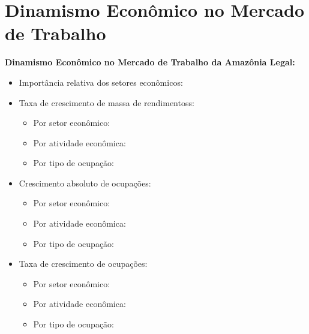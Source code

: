 \documentclass[8pt]{beamer}
\begin{document}
\section{Dinamismo Econômico no Mercado de Trabalho}

\begin{frame}[label=indice_principal_amz]{}

\textit{\hyperlink{indice_principal}{}}

\textbf{Dinamismo Econômico no Mercado de Trabalho da Amazônia Legal:}
\vspace{2mm}
\begin{itemize}

\item{Importância relativa dos setores econômicos: \hyperlink{_importancia_relativa}{}}
\vspace{1mm}

\item{Taxa de crescimento  de massa de rendimentoss:
	\begin{itemize}
	\item{Por setor econômico: \hyperlink{rkngtxmassaporsetor}{}}
	\item{Por atividade econômica: \hyperlink{rkngtxmassaporatividade}{}}
	\item{Por tipo de ocupação: \hyperlink{rkngtxmassaporocupacao}{}}
	\end{itemize}
}
\vspace{1mm}

\item{Crescimento  absoluto de ocupações:
	\begin{itemize}
	\item{Por setor econômico: \hyperlink{rkngnocuporsetor}{}}
	\item{Por atividade econômica: \hyperlink{rkngnocuporatividade}{}}
	\item{Por tipo de ocupação: \hyperlink{rkngnocuporocupacao}{}}
	\end{itemize}
}
\vspace{1mm}

\item{Taxa de crescimento de ocupações:
	\begin{itemize}
	\item{Por setor econômico: \hyperlink{rkngtxocuporsetor}{}}
	\item{Por atividade econômica: \hyperlink{rkngtxocuporatividade}{}}
	\item{Por tipo de ocupação: \hyperlink{rkngtxocuporocupacao}{}}
	\end{itemize}
}
\vspace{1mm}


\end{itemize}
\end{frame}
\end{document}
